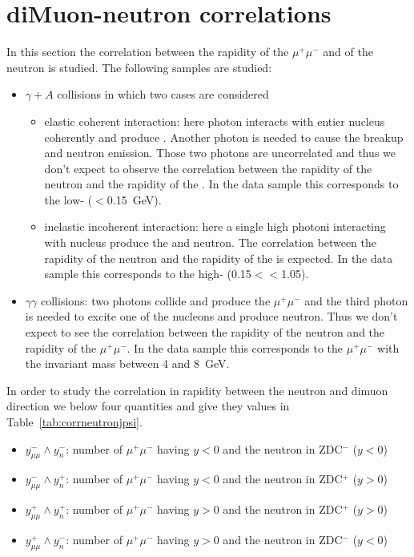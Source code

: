   \section{diMuon-neutron correlations}
    In this section the correlation between the rapidity of the $\mu^{+}\mu^{-}$ 
      and of the neutron is studied. The following samples are studied: 
    \begin{itemize}
      \item $\gamma + A$ collisions in which two cases are considered
      \begin{itemize}
        \item elastic coherent interaction: here photon interacts with entier
          nucleus coherently and produce \JPsi. 
          Another photon is needed to cause the breakup and neutron emission. 
          Those two photons are uncorrelated and thus we don't expect to 
            observe the correlation between the rapidity of the neutron and the
            rapidity of the \JPsi.
          In the data sample this corresponds to the low-\pt \JPsi 
            (\pt$<$0.15~GeV). 
        \item inelastic incoherent interaction: here a single high \pt photoni
          interacting with nucleus produce the \JPsi and neutron. 
          The correlation between the rapidity of the neutron and the rapidity
            of the \JPsi is expected.
          In the data sample this corresponds to the high-\pt \JPsi 
            (0.15$<$\pt$<$1.05). 
      \end{itemize}
      \item $\gamma \gamma$ collisions: two photons collide and produce the 
        $\mu^{+}\mu^{-}$  and the third photon is needed to excite one of
          the nucleons and produce neutron. 
        Thus we don't expect to see the correlation between the rapidity of the
          neutron and the rapidity of the $\mu^{+}\mu^{-}$. 
        In the data sample this corresponds to the $\mu^{+}\mu^{-}$ with the
          invariant mass between 4 and 8~GeV. 
    \end{itemize}

    In order to study the correlation in rapidity between the neutron and
      dimuon direction we below four quantities and give they values in 
      Table~\ref{tab:corrneutronjpsi}.  
    \begin{itemize}
      \item $y^{-}_{\mu\mu} \wedge y_{n}^{-}$: number of $\mu^{+}\mu^{-}$ having
         $y<0$ and the neutron in ZDC$^{-}$ ($y<0$)
      \item $y^{-}_{\mu\mu} \wedge y_{n}^{+}$: number of $\mu^{+}\mu^{-}$ having
         $y<0$ and the neutron in ZDC$^{+}$ ($y>0$)
      \item $y^{+}_{\mu\mu} \wedge y_{n}^{+}$: number of $\mu^{+}\mu^{-}$ having
         $y>0$ and the neutron in ZDC$^{+}$ ($y>0$)
      \item $y^{+}_{\mu\mu} \wedge y_{n}^{-}$: number of $\mu^{+}\mu^{-}$ having
         $y>0$ and the neutron in ZDC$^{-}$ ($y<0$)
    \end{itemize}

